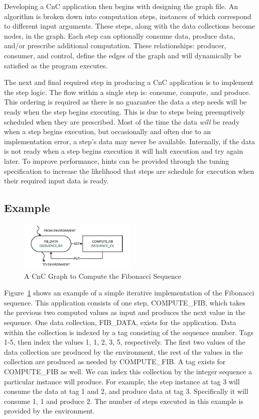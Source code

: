 Developing a CnC application then begins with designing the graph
file. An algorithm is broken down into computation steps, instances of
which correspond to different input arguments. These steps, along with
the data collections become nodes, in the graph. Each step can
optionally consume data, produce data, and/or prescribe additional
computation. These relationships: producer, consumer, and control,
define the edges of the graph and will dynamically be satisfied as the
program executes.

The next and final required step in producing a CnC application is to
implement the step logic. The flow within a single step is: consume,
compute, and produce. This ordering is required as there is no
guarantee the data a step needs will be ready when the step begins
executing. This is due to steps being preemptively scheduled when they
are prescribed. Most of the time the data \emph{will} be ready when a
step begins execution, but occasionally and often due to an
implementation error, a step's data may never be available.
Internally, if the data is not ready when a step begins execution
it will halt execution and try again later. To improve performance,
hints can be provided through the tuning specification to increase the
likelihood that steps are schedule for execution when their required
input data is ready.

\subsection{Example}
\label{sec:cnc_example}

\begin{figure}[!tb]
  \centering
  \includegraphics[width=0.5\textwidth]{drawings/FibExample.pdf}
  \caption{A CnC Graph to Compute the Fibonacci Sequence}
  \label{fig:fib_graph}
\end{figure}

Figure~\ref{fig:fib_graph} shows an example of a
simple iterative implementation of the Fibonacci sequence. This
application consists of one step, COMPUTE\_FIB, which takes the
previous two computed values as input and produces the next value in
the sequence. One data collection, FIB\_DATA, exists for the
application. Data within the collection is indexed by a tag consisting
of the sequence number. Tags 1-5, then index the values 1,
1, 2, 3, 5, respectively. The first two values of the data collection
are produced by the environment, the rest of the values in the
collection are produced as needed by COMPUTE\_FIB. A tag exists for
COMPUTE\_FIB as well. We can index this collection by the integer
sequence a particular instance will produce. For example, the step
instance at tag 3 will consume the data at tag 1 and 2, and produce
data at tag 3. Specifically it will consume 1, 1 and produce 2.
The number of steps executed in this example is provided by the 
environment.

